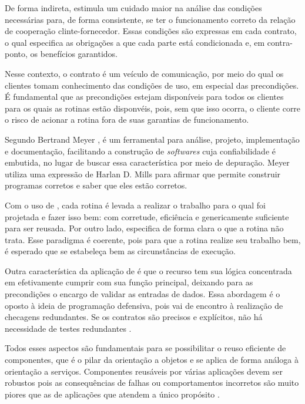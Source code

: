 De forma indireta, \designbycontract{} estimula um cuidado maior na análise das
condições necessárias para, de forma consistente, se ter o funcionamento correto
da relação de cooperação clinte-fornecedor.
Essas condições são expressas em cada contrato, o qual especifica as obrigações
a que cada parte está condicionada e, em contra-ponto, os benefícios garantidos.

Nesse contexto, o contrato é um veículo de comunicação, por meio do qual os
clientes tomam conhecimento das condições de uso, em especial das precondições.
É fundamental que as precondições estejam disponíveis para todos os clientes
para os quais as rotinas estão disponvéis, pois, sem que isso ocorra, o cliente
corre o risco de acionar a rotina fora de suas garantias de funcionamento. 

Segundo Bertrand Meyer \cite{meyer1997object}, \designbycontract{} é um
ferramental para análise, projeto, implementação e documentação, facilitando a
construção de \textit{softwares} cuja confiabilidade é embutida, no lugar de
buscar essa característica por meio de depuração. Meyer utiliza uma expressão de
Harlan D. Mills \cite{mills1975new} para afirmar que \designbycontract{} permite
construir programas corretos e saber que eles estão corretos.

Com o uso de \designbycontract{}, cada rotina é levada a realizar o trabalho
para o qual foi projetada e fazer isso bem: com corretude, eficiência e
genericamente suficiente para ser reusada. Por outro lado, especifica de forma
clara o que a rotina não trata. Esse paradigma é coerente, pois para que a
rotina realize seu trabalho bem, é esperado que se estabeleça bem as
circunstâncias de execução.

Outra característica da aplicação de \designbycontract{} é que o recurso tem sua
lógica concentrada em efetivamente cumprir com sua função principal, deixando
para as precondições o encargo de validar as entradas de dados. Essa abordagem
é o oposto à ideia de programação defensiva, pois vai de encontro à realização
de checagens redundantes. Se os contratos são precisos e explícitos, não há
necessidade de testes redundantes \cite{meyer1992applying}.

Todos esses aspectos são fundamentais para se possibilitar o reuso eficiente de
componentes, que é o pilar da orientação a objetos e se aplica de forma análoga
à orientação a serviços. Componentes reusáveis por várias aplicações devem ser
robustos pois as consequências de falhas ou comportamentos incorretos são muito
piores que as de aplicações que atendem a único propósito
\cite{meyer1992applying}.

